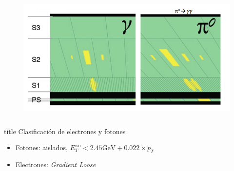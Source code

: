 \documentclass[10pt, compress,spanish]{beamer}
\begin{document}
\begin{frame}[fragile]
\begin{columns}
\begin{column}{0.5\textwidth}
\begin{figure}
\centering
\includegraphics[width=1.15\textwidth]{Gamma_pi.png}
\end{figure}
\end{column}

\end{columns}

\begin{beamercolorbox}[leftskip=\titlelf]{title}
\normalsize Clasificación de electrones y fotones
\end{beamercolorbox}
\begin{itemize}

\item Fotones: aislados, $E_{T}^{\text{iso}}<2.45 \text{GeV} + 0.022 \times p_{T}$

\item Electrones: \textit{Gradient Loose}

\end{itemize}




\end{frame}



\end{document}
